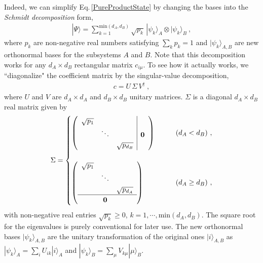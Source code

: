 Indeed, we can simplify Eq.\,\eqref{PureProductState} by changing the bases into the \emph{Schmidt decomposition} form,
\begin{align}\label{PureDiag}
|\Psi\rangle = \sum_{k=1}^{\text{min}(d_A, d_B)} \sqrt{p_k}\, |\psi_k\rangle_A\otimes  |\psi_k \rangle_B \ ,
\end{align}
where $p_k$ are non-negative real numbers satisfying $\sum_k p_k = 1$ and
$|\psi_k\rangle_{A,B} $ are new orthonormal bases for the subsystems $A$ and $B$.
Note that this decomposition works for any $d_A \times d_B$ rectangular matrix $c_{i\mu}$.
To see how it actually works, we ``diagonalize" the coefficient matrix by the singular-value decomposition,
\begin{align}
c = U \, \Sigma\, V^\dagger \ ,
\end{align}
where $U$ and $V$ are $d_A \times d_A$ and $d_B\times d_B$ unitary matrices.
$\Sigma$ is a diagonal $d_A\times d_B$ real matrix given by
\begin{align}
	\Sigma = 
		\begin{cases}
			\left(\begin{array}{ccc|c}
			\sqrt{p_1} & & &  \\
			& \ddots & & \bf 0 \\
			& & \sqrt{p_{d_B}} & 
			\end{array}\right)  &\qquad  (d_A < d_B) \ , \\
			\\
			\left(\begin{array}{ccc}
			\sqrt{p_1} & &  \\
			& \ddots &  \\
			& & \sqrt{p_{d_A}}\\
			\hline
			 & \bf 0 &
			\end{array}\right) &\qquad  (d_A \ge d_B) \ , 
		\end{cases}
\end{align}
with non-negative real entries $\sqrt{p_k}\ge 0$, $k=1,\cdots, \text{min}(d_A, d_B)$.
The square root for the eigenvalues is purely conventional for later use.
The new orthonormal bases  $|\psi_k\rangle_{A,B}$ are the unitary transformation of the original ones $|i\rangle_{A,B}$ as $|\psi_k\rangle_A = \sum_{i} U_{ik} |i\rangle_A$ and $|\psi_k\rangle_B = \sum_{\mu} V_{k\mu} |\mu\rangle_B$.

